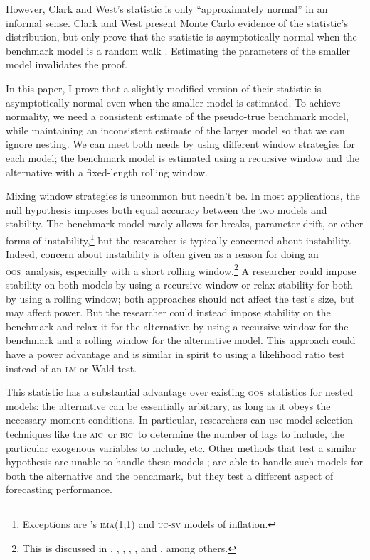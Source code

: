 \documentclass[12pt]{article}
\newcommand\possessivecite[1]{\citeauthor{#1}'s \citeyearpar{#1}}
\newcommand{\aic}{\textsc{aic}}
\newcommand{\bic}{\textsc{bic}}
\newcommand{\oos}{\textsc{oos}}
\begin{document}
However, Clark and West's statistic is only ``approximately normal''
in an informal sense.  Clark and West present Monte Carlo evidence of
the statistic's distribution, but only prove that the statistic is
asymptotically normal when the benchmark model is a random walk
\citep{ClW:06}. Estimating the parameters of the smaller model
invalidates the proof.

In this paper, I prove that a slightly modified version of their
statistic is asymptotically normal even when the smaller model is
estimated.  To achieve normality, we need a consistent estimate of the
pseudo-true benchmark model, while maintaining an inconsistent
estimate of the larger model so that we can ignore nesting.  We can
meet both needs by using different window strategies for each model;
the benchmark model is estimated using a recursive window and the
alternative with a fixed-length rolling window.

Mixing window strategies is uncommon but needn't be. In most
applications, the null hypothesis imposes both equal accuracy between
the two models and stability.  The benchmark model rarely allows for
breaks, parameter drift, or other forms of
instability,\footnote{Exceptions are \possessivecite{StW:07}
  \textsc{ima}(1,1) and \textsc{uc-sv} models of inflation.} but the
researcher is typically concerned about instability.  Indeed, concern
about instability is often given as a reason for doing an \oos\
analysis, especially with a short rolling window.\footnote{This is
  discussed in \citet{StW:03}, \citet{PeT:05,PeT:07}, \cite{GiW:06},
  \citet{GoW:08}, \citet{ClM:09c}, and \cite{GiR:09,GiR:10}, among
  others.} A researcher could impose stability on both models by using
a recursive window or relax stability for both by using a rolling
window; both approaches should not affect the test's size, but may
affect power.  But the researcher could instead impose stability on
the benchmark and relax it for the alternative by using a recursive
window for the benchmark and a rolling window for the alternative
model.  This approach could have a power advantage and is similar in
spirit to using a likelihood ratio test instead of an \textsc{lm} or
Wald test.

This statistic has a substantial advantage over existing \oos\
statistics for nested models: the alternative can be essentially
arbitrary, as long as it obeys the necessary moment conditions.  In
particular, researchers can use model selection techniques like the
\aic\ or \bic\ to determine the number of lags to include, the
particular exogenous variables to include, etc.  Other methods that
test a similar hypothesis are unable to handle these models
\citep[except][which does not allow the benchmark to be
estimated]{ClW:06}; \citet{GiW:06} are able to handle such models for
both the alternative and the benchmark, but they test a different
aspect of forecasting performance.
\end{document}
